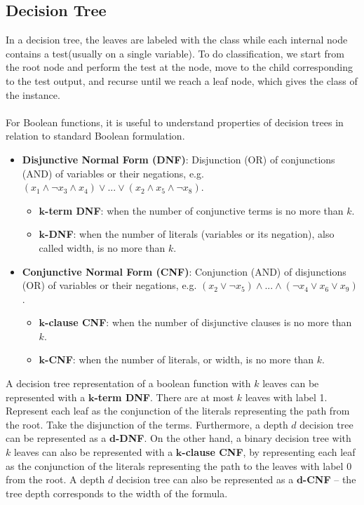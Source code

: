 \documentclass{article}
\begin{document}
   \subsection{Decision Tree}
   In a decision tree, the leaves are labeled with the class while each internal node contains a test(usually on a single variable). To do classification, we start from the root node and perform the test at the node, move to the child corresponding to the test output, and recurse until we reach a leaf node, which gives the class of the instance.
   \\\\
   For Boolean functions, it is useful to understand properties of decision trees in relation to standard Boolean formulation.
   \begin{itemize}
   \item \textbf{Disjunctive Normal Form (DNF)}: Disjunction (OR) of conjunctions (AND) of variables or their negations, e.g. $(x_1 \wedge \neg x_3 \wedge x_4) \vee ... \vee (x_2 \wedge x_5 \wedge \neg x_8)$.
   \begin{itemize}
   	\item \textbf{$\mathbf{k}$-term DNF}: when the number of conjunctive terms is no more than $k$.
    \item \textbf{$\mathbf{k}$-DNF}: when the number of literals (variables or its negation), also called width, is no more than $k$.
   \end{itemize}
   
   \item \textbf{Conjunctive Normal Form (CNF)}: Conjunction (AND) of disjunctions (OR) of variables or their negations, e.g. $(x_2 \vee \neg x_5) \wedge ... \wedge (\neg x_4 \vee x_6 \vee x_9)$.
   \begin{itemize}
   \item \textbf{$\mathbf{k}$-clause CNF}: when the number of disjunctive clauses is no more than $k$.
   \item \textbf{$\mathbf{k}$-CNF}: when the number of literals, or width, is no more than $k$.
   \end{itemize}
   \end{itemize}
   A decision tree representation of a boolean function with $k$ leaves can be represented with a \textbf{$\mathbf{k}$-term DNF}. There are at most $k$ leaves with label 1. Represent each leaf as the conjunction of the literals representing the path from the root. Take the disjunction of the terms. Furthermore, a depth $d$ decision tree can be represented as a \textbf{$\mathbf{d}$-DNF}. On the other hand, a binary decision tree with $k$ leaves can also be represented with a \textbf{$\mathbf{k}$-clause CNF}, by representing each leaf as the conjunction of the literals representing the path to the leaves with label 0 from the root. A depth $d$ decision tree can also be represented as a \textbf{$\mathbf{d}$-CNF} -- the tree depth corresponds to the width of the formula.
\end{document}
